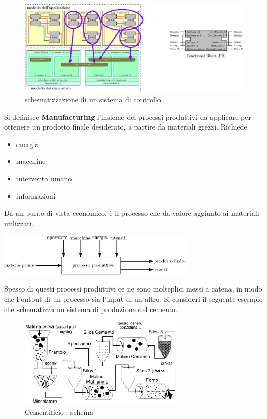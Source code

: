 \documentclass[10pt, letterpaper]{report}
\begin{document}
\begin{figure}[h!]
    \centering
    \includegraphics[width=1\textwidth ]{images/sistemaControllo.eps}
    \caption{schematizzazione di un sistema di controllo}
    \label{fig:siscon}
\end{figure} 
Si definisce \textbf{Manufacturing} l'insieme dei processi 
produttivi da applicare per ottenere un prodotto finale desiderato, a partire 
da materiali grezzi. Richiede \begin{itemize}
    \item energia 
    \item macchine 
    \item intervento umano 
    \item informazioni
\end{itemize}
Da un punto di vista economico, è il processo che da valore aggiunto
ai materiali utilizzati.\begin{center}
    \includegraphics[width=0.7\textwidth ]{images/manifacturing.eps}
\end{center}
Spesso di questi processi produttivi ce ne sono molteplici messi a catena, in modo che l'output di un 
processo sia l'input di un altro. Si consideri il seguente esempio che schematizza un sistema di produzione del cemento.
\begin{figure}[h!]
    \centering
    \includegraphics[width=0.7\textwidth ]{images/cementificio.pdf}
    \caption{Cementificio : schema}
    \label{fig:cementificio}
\end{figure} 
\end{document}
